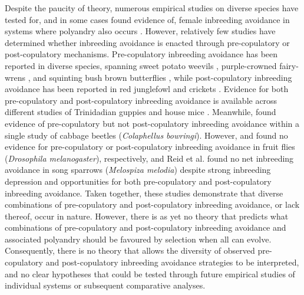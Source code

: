 \documentclass[10pt,letterpaper]{article}
\begin{document}
Despite the paucity of theory, numerous empirical studies on diverse species have tested for, and in some cases found evidence of, female inbreeding avoidance in systems where polyandry also occurs \cite[][but see \citealt{Reid2015a}]{Tregenza2002, Varian-Ramos2012, Kingma2013, Arct2015}. However, relatively few studies have determined whether inbreeding avoidance is enacted through pre-copulatory or post-copulatory mechanisms. Pre-copulatory inbreeding avoidance has been reported in diverse species, spanning sweet potato weevils \cite[\textit{Cylas formicarius};][]{Kuriwada2011}, purple-crowned fairy-wrens \cite[\textit{Malurus coronatus};][]{Kuriwada2011}, and squinting bush brown butterflies \cite[\textit{Bicyclus anynana};][]{Fischer2015}, while post-copulatory inbreeding avoidance has been reported in red junglefowl \cite[\textit{Gallus gallus};][]{Pizzari2004} and crickets \cite[\textit{Teleogryllus oceanicus}, \textit{Gryllus bimaculatus};][]{Simmons2006, Bretman2009}. Evidence for both pre-copulatory and post-copulatory inbreeding avoidance is available across different studies of Trinidadian guppies \cite[\textit{Poecilia reticulata};][]{Gasparini2011, Daniel2015} and house mice \cite[\textit{Mus domesticus};][]{Potts1991, Firman2015}. Meanwhile, \cite{Liu2014} found evidence of pre-copulatory but not post-copulatory inbreeding avoidance within a single study of cabbage beetles (\textit{Colaphellus bowringi}). However, \cite{Ala-Honkola2011} and \cite{Tan2012} found no evidence for pre-copulatory or post-copulatory inbreeding avoidance in fruit flies (\textit{Drosophila melanogaster}), respectively, and Reid et al. \citeyearpar{Reid2014, Reid2015} found no net inbreeding avoidance in song sparrows (\textit{Melospiza melodia}) despite strong inbreeding depression and opportunities for both pre-copulatory and post-copulatory inbreeding avoidance. Taken together, these studies demonstrate that diverse combinations of pre-copulatory and post-copulatory inbreeding avoidance, or lack thereof, occur in nature. However, there is as yet no theory that predicts what combinations of pre-copulatory and post-copulatory inbreeding avoidance and associated polyandry should be favoured by selection when all can evolve. Consequently, there is no theory that allows the diversity of observed pre-copulatory and post-copulatory inbreeding avoidance strategies to be interpreted, and no clear hypotheses that could be tested through future empirical studies of individual systems or subsequent comparative analyses.
\end{document}
